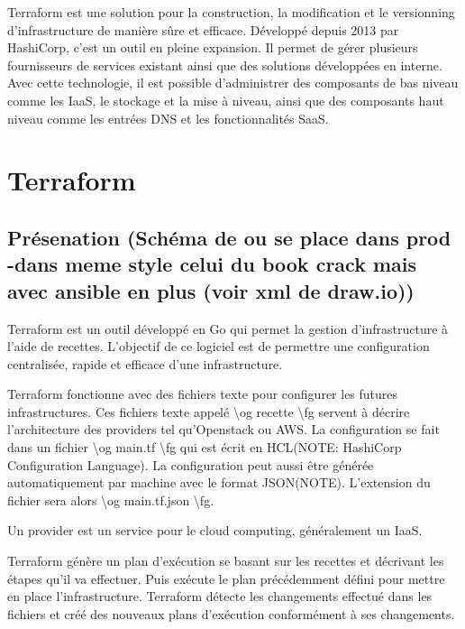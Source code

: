\documentclass[]{article}
\begin{document}
Terraform est une solution pour la construction, la modification et le
versionning d'infrastructure de manière sûre et efficace. Développé
depuis 2013 par HashiCorp, c'est un outil en pleine expansion. Il permet
de gérer plusieurs fournisseurs de services existant ainsi que des
solutions développées en interne. Avec cette technologie, il est
possible d'administrer des composants de bas niveau comme les IaaS, le
stockage et la mise à niveau, ainsi que des composants haut niveau comme
les entrées DNS et les fonctionnalités SaaS.

\section{Terraform}\label{terraform}

\subsection{Présenation (Schéma de ou se place dans prod -dans meme
style celui du book crack mais avec ansible en plus (voir xml de
draw.io))}\label{pruxe9senation-schuxe9ma-de-ou-se-place-dans-prod--dans-meme-style-celui-du-book-crack-mais-avec-ansible-en-plus-voir-xml-de-draw.io}

Terraform est un outil développé en Go qui permet la gestion
d'infrastructure à l'aide de recettes. L'objectif de ce logiciel est de
permettre une configuration centralisée, rapide et efficace d'une
infrastructure.

Terraform fonctionne avec des fichiers texte pour configurer les futures
infrastructures. Ces fichiers texte appelé \textbackslash{}og recette
\textbackslash{}fg servent à décrire l'architecture des providers tel
qu'Openstack ou AWS. La configuration se fait dans un fichier
\textbackslash{}og main.tf \textbackslash{}fg qui est écrit en HCL(NOTE:
HashiCorp Configuration Language). La configuration peut aussi être
générée automatiquement par machine avec le format JSON(NOTE).
L'extension du fichier sera alors \textbackslash{}og main.tf.json
\textbackslash{}fg.

Un provider est un service pour le cloud computing, généralement un
IaaS.

Terraform génère un plan d'exécution se basant sur les recettes et
décrivant les étapes qu'il va effectuer. Puis exécute le plan
précédemment défini pour mettre en place l'infrastructure. Terraform
détecte les changements effectué dans les fichiers et créé des nouveaux
plans d'exécution conformément à ses changements.
\end{document}
